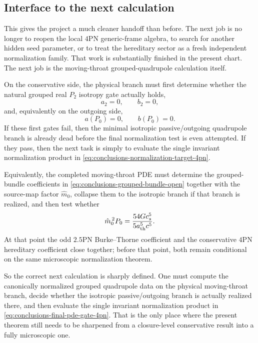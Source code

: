 \documentclass[11pt]{article}
\begin{document}
\subsection{Interface to the next calculation}
\label{sec:conclusions-next}

This gives the project a much cleaner handoff than before.  The next job is no
longer to reopen the local $4$PN generic-frame algebra, to search for another
hidden seed parameter, or to treat the hereditary sector as a fresh independent
normalization family.  That work is substantially finished in the present
chart.  The next job is the moving-throat grouped-quadrupole calculation
itself.

On the conservative side, the physical branch must first determine whether the
natural grouped real $P_2$ isotropy gate actually holds,
\begin{equation}
\boxed{a_2=0,
\qquad
b_2=0,}
\label{eq:conclusions-isotropy-gate-4pn}
\end{equation}
and, equivalently on the outgoing side,
\begin{equation}
\boxed{a(P_0)=0,
\qquad
b(P_0)=0.}
\label{eq:conclusions-prefactor-isotropy-gate-4pn}
\end{equation}
If these first gates fail, then the minimal isotropic passive/outgoing
quadrupole branch is already dead before the final normalization test is even
attempted.  If they pass, then the next task is simply to evaluate the single
invariant normalization product in
\eqref{eq:conclusions-normalization-target-4pn}.

Equivalently, the completed moving-throat PDE must determine the grouped-bundle
coefficients in \eqref{eq:conclusions-grouped-bundle-open} together with the
source-map factor $\hat m_0$, collapse them to the isotropic branch if that
branch is realized, and then test whether
\begin{equation}
\hat m_0^{\,2}P_0=\frac{54Gc_s^5}{5a_{\rm th}^5c^5}.
\label{eq:conclusions-final-pde-gate-4pn}
\end{equation}
At that point the odd $2.5$PN Burke--Thorne coefficient and the conservative
$4$PN hereditary coefficient close together; before that point, both remain
conditional on the same microscopic normalization theorem.

So the correct next calculation is sharply defined.  One must compute the
canonically normalized grouped quadrupole data on the physical moving-throat
branch, decide whether the isotropic passive/outgoing branch is actually
realized there, and then evaluate the single invariant normalization product in
\eqref{eq:conclusions-final-pde-gate-4pn}.  That is the only place where the
present theorem still needs to be sharpened from a closure-level conservative
result into a fully microscopic one.
\end{document}
